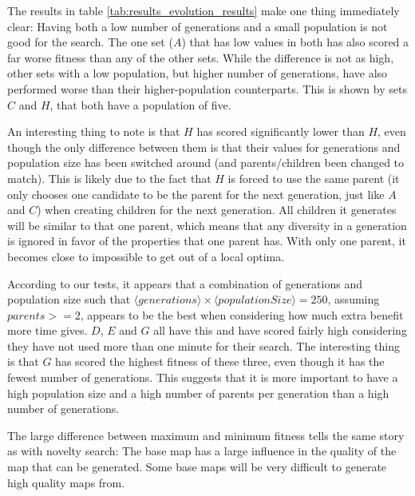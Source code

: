 The results in table \ref{tab:results_evolution_results} make one thing immediately clear: Having both a low number of generations and a small population is not good for the search. The one set ($A$) that has low values in both has also scored a far worse fitness than any of the other sets. While the difference is not as high, other sets with a low population, but higher number of generations, have also performed worse than their higher-population counterparts. This is shown by sets $C$ and $H$, that both have a population of five.

An interesting thing to note is that $H$ has scored significantly lower than $H$, even though the only difference between them is that their values for generations and population size has been switched around (and parents/children been changed to match). This is likely due to the fact that $H$ is forced to use the same parent (it only chooses one candidate to be the parent for the next generation, just like $A$ and $C$) when creating children for the next generation. All children it generates will be similar to that one parent, which means that any diversity in a generation is ignored in favor of the properties that one parent has. With only one parent, it becomes close to impossible to get out of a local optima.

According to our tests, it appears that a combination of generations and population size such that $\langle generations \rangle \times \langle populationSize \rangle = 250$, assuming $parents >= 2$, appears to be the best when considering how much extra benefit more time gives. $D$, $E$ and $G$ all have this and have scored fairly high considering they have not used more than one minute for their search. The interesting thing is that $G$ has scored the highest fitness of these three, even though it has the fewest number of generations. This suggests that it is more important to have a high population size and a high number of parents per generation than a high number of generations.

The large difference between maximum and minimum fitness tells the same story as with novelty search: The base map has a large influence in the quality of the map that can be generated. Some base maps will be very difficult to generate high quality maps from.

